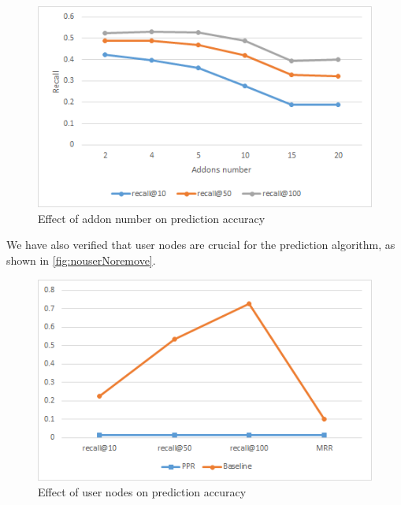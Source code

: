 \documentclass[11pt,oneside]{book}
\begin{document}
\begin{figure}[p]
\centering
\includegraphics[scale=1,angle=0]{figures/addonsNumberGraph.png}
\caption{Effect of addon number on prediction accuracy}
\label{fig:addonsNumberGraph}
\end{figure}



We have also verified that user nodes are crucial for the prediction
algorithm, as shown in \autoref{fig:nouserNoremove}.

\begin{figure}[h]
\centering
\includegraphics[scale=.8,angle=0]{figures/nouserNoremove.png}
\caption{Effect of user nodes on prediction accuracy}
\label{fig:nouserNoremove}
\end{figure}
\end{document}
